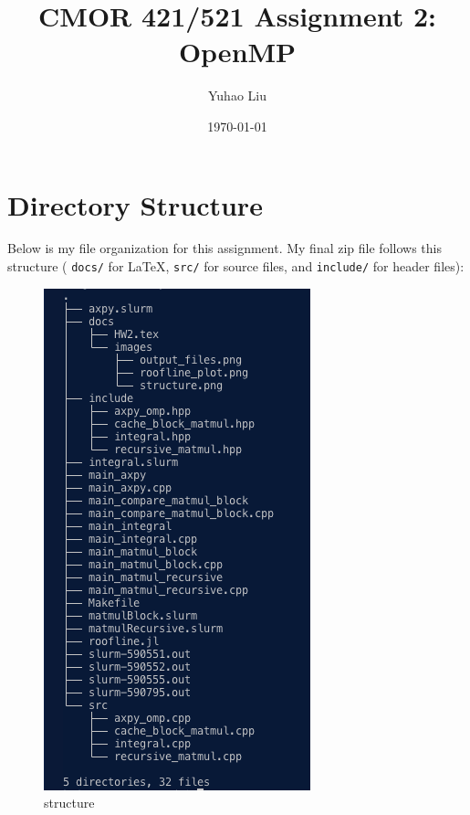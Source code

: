 \documentclass[11pt]{article}
\title{CMOR 421/521 Assignment 2: OpenMP}
\author{Yuhao Liu}
\date{\today}
\begin{document}
\maketitle

\tableofcontents
\bigskip

\newpage

\section{Directory Structure}
Below is my file organization for this assignment. 
My final zip file follows this structure ( \texttt{docs/} for LaTeX, \texttt{src/} for source files, and \texttt{include/} for header files):

\begin{figure}[H]
    \centering
    \includegraphics[width=0.3\linewidth]{Assignments/HW2/docs/images/structure.png}
    \caption{structure}
    \label{fig:structure}
\end{figure}
\end{document}
